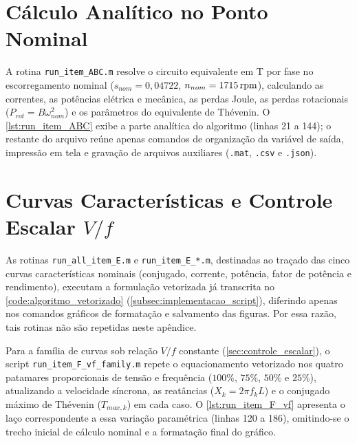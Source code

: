 

\section{Cálculo Analítico no Ponto Nominal}\label{sec:codigo_item_abc}

A rotina \texttt{run\_\allowbreak{}item\_\allowbreak{}ABC.m} resolve o circuito equivalente em T por fase no escorregamento nominal ($s_{nom} = 0{,}04722$, $n_{nom} = \SI{1715}{\mathrm{rpm}}$), calculando as correntes, as potências elétrica e mecânica, as perdas Joule, as perdas rotacionais ($P_{rot} = B\omega_{nom}^2$) e os parâmetros do equivalente de Thévenin. O \cref{lst:run_item_ABC} exibe a parte analítica do algoritmo (linhas 21 a 144); o restante do arquivo reúne apenas comandos de organização da variável de saída, impressão em tela e gravação de arquivos auxiliares (\texttt{.mat}, \texttt{.csv} e \texttt{.json}).



\section{Curvas Características e Controle Escalar $V/f$}\label{sec:codigo_vf_family}

As rotinas \texttt{run\_all\_item\_E.m} e \texttt{run\_item\_E\_*.m}, destinadas ao traçado das cinco curvas características nominais (conjugado, corrente, potência, fator de potência e rendimento), executam a formulação vetorizada já transcrita no \cref{code:algoritmo_vetorizado} (\cref{subsec:implementacao_script}), diferindo apenas nos comandos gráficos de formatação e salvamento das figuras. Por essa razão, tais rotinas não são repetidas neste apêndice.

Para a família de curvas sob relação $V/f$ constante (\cref{sec:controle_escalar}), o script \texttt{run\_\allowbreak{}item\_\allowbreak{}F\_\allowbreak{}vf\_\allowbreak{}family.m} repete o equacionamento vetorizado nos quatro patamares proporcionais de tensão e frequência ($100\%$, $75\%$, $50\%$ e $25\%$), atualizando a velocidade síncrona, as reatâncias ($X_k = 2\pi f_k L$) e o conjugado máximo de Thévenin ($T_{max,k}$) em cada caso. O \cref{lst:run_item_F_vf} apresenta o laço correspondente a essa variação paramétrica (linhas 120 a 186), omitindo-se o trecho inicial de cálculo nominal e a formatação final do gráfico.

